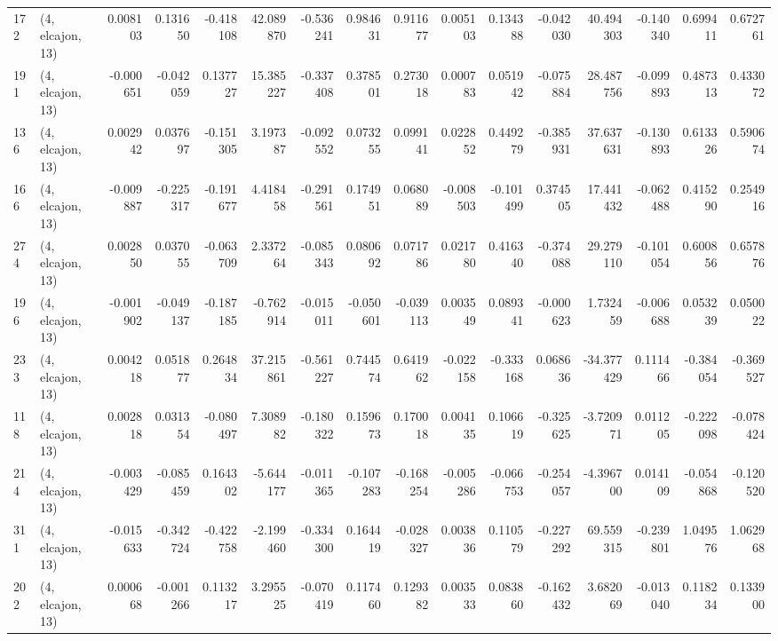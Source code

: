 \begin{tabular}{llrrrrrrrrrrrrrr}
172 &  (4, elcajon, 13) &   0.008103 &  0.131650 & -0.418108 &   42.089870 & -0.536241 &   0.984631 &   0.911677 &  0.005103 &  0.134388 & -0.042030 &   40.494303 & -0.140340 &   0.699411 &   0.672761 \\
191 &  (4, elcajon, 13) &  -0.000651 & -0.042059 &  0.137727 &   15.385227 & -0.337408 &   0.378501 &   0.273018 &  0.000783 &  0.051942 & -0.075884 &   28.487756 & -0.099893 &   0.487313 &   0.433072 \\
136 &  (4, elcajon, 13) &   0.002942 &  0.037697 & -0.151305 &    3.197387 & -0.092552 &   0.073255 &   0.099141 &  0.022852 &  0.449279 & -0.385931 &   37.637631 & -0.130893 &   0.613326 &   0.590674 \\
166 &  (4, elcajon, 13) &  -0.009887 & -0.225317 & -0.191677 &    4.418458 & -0.291561 &   0.174951 &   0.068089 & -0.008503 & -0.101499 &  0.374505 &   17.441432 & -0.062488 &   0.415290 &   0.254916 \\
274 &  (4, elcajon, 13) &   0.002850 &  0.037055 & -0.063709 &    2.337264 & -0.085343 &   0.080692 &   0.071786 &  0.021780 &  0.416340 & -0.374088 &   29.279110 & -0.101054 &   0.600856 &   0.657876 \\
196 &  (4, elcajon, 13) &  -0.001902 & -0.049137 & -0.187185 &   -0.762914 & -0.015011 &  -0.050601 &  -0.039113 &  0.003549 &  0.089341 & -0.000623 &    1.732459 & -0.006688 &   0.053239 &   0.050022 \\
233 &  (4, elcajon, 13) &   0.004218 &  0.051877 &  0.264834 &   37.215861 & -0.561227 &   0.744574 &   0.641962 & -0.022158 & -0.333168 &  0.068636 &  -34.377429 &  0.111466 &  -0.384054 &  -0.369527 \\
118 &  (4, elcajon, 13) &   0.002818 &  0.031354 & -0.080497 &    7.308982 & -0.180322 &   0.159673 &   0.170018 &  0.004135 &  0.106619 & -0.325625 &   -3.720971 &  0.011205 &  -0.222098 &  -0.078424 \\
214 &  (4, elcajon, 13) &  -0.003429 & -0.085459 &  0.164302 &   -5.644177 & -0.011365 &  -0.107283 &  -0.168254 & -0.005286 & -0.066753 & -0.254057 &   -4.396700 &  0.014109 &  -0.054868 &  -0.120520 \\
311 &  (4, elcajon, 13) &  -0.015633 & -0.342724 & -0.422758 &   -2.199460 & -0.334300 &   0.164419 &  -0.028327 &  0.003836 &  0.110579 & -0.227292 &   69.559315 & -0.239801 &   1.049576 &   1.062968 \\
202 &  (4, elcajon, 13) &   0.000668 & -0.001266 &  0.113217 &    3.295525 & -0.070419 &   0.117460 &   0.129382 &  0.003533 &  0.083860 & -0.162432 &    3.682069 & -0.013040 &   0.118234 &   0.133900 \\

\end{tabular}
